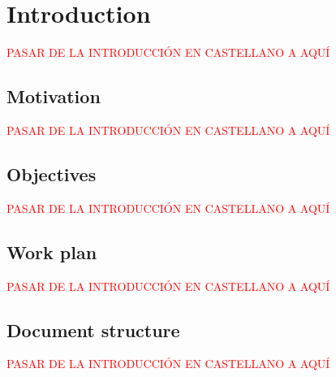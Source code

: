 \chapter*{Introduction}
\label{cap:introduction}


\textcolor{red}{PASAR DE LA INTRODUCCIÓN EN CASTELLANO A AQUÍ}

\section{Motivation}
\textcolor{red}{PASAR DE LA INTRODUCCIÓN EN CASTELLANO A AQUÍ}

\section{Objectives}
\textcolor{red}{PASAR DE LA INTRODUCCIÓN EN CASTELLANO A AQUÍ}

\section{Work plan}

\textcolor{red}{PASAR DE LA INTRODUCCIÓN EN CASTELLANO A AQUÍ}

\section{Document structure}
\textcolor{red}{PASAR DE LA INTRODUCCIÓN EN CASTELLANO A AQUÍ}



